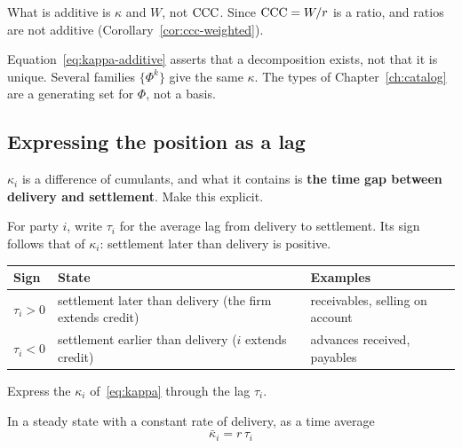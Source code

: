 What is additive is $\kappa$ and $W$, not $\mathrm{CCC}$. Since $\mathrm{CCC}=W/r$ is a ratio, and ratios
are not additive (Corollary~\ref{cor:ccc-weighted}).

\begin{remark}
\label{rem:decomposition-not-unique}
Equation~\eqref{eq:kappa-additive} asserts that a decomposition exists, not that it is
unique. Several families $\{\Phi^k\}$ give the same $\kappa$. The types of
Chapter~\ref{ch:catalog} are a generating set for $\Phi$, not a basis.
\end{remark}

\subsection{Expressing the position as a lag}
\label{sec:tau}

$\kappa_i$ is a difference of cumulants, and what it contains is \textbf{the time gap
between delivery and settlement}. Make this explicit.

\begin{definition}
For party $i$, write $\tau_i$ for the average lag from delivery to settlement. Its sign
follows that of $\kappa_i$: settlement later than delivery is positive.
\begin{center}
\begin{tabularx}{\textwidth}{@{}lXl@{}}
\toprule
Sign & State & Examples \\
\midrule
$\tau_i>0$ & settlement later than delivery (the firm extends credit) & receivables, selling on account \\
$\tau_i<0$ & settlement earlier than delivery ($i$ extends credit) & advances received, payables \\
\bottomrule
\end{tabularx}
\label{tab:tau-sign}
\end{center}
\end{definition}

Express the $\kappa_i$ of~\eqref{eq:kappa} through the lag $\tau_i$.

\begin{proposition}
\label{prop:kappa-tau}
In a steady state with a constant rate of delivery, as a time average
\begin{equation}
\bar{\kappa}_i = r\,\tau_i
\label{eq:kappa-tau}
\end{equation}
\end{proposition}


